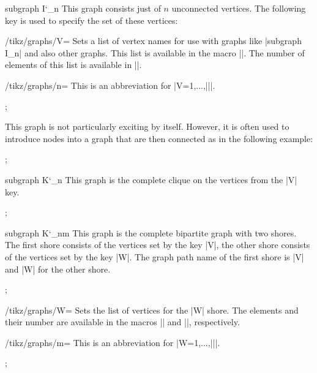 \begin{graph}{subgraph I\char`\_n}
  This graph consists just of $n$ unconnected vertices. The following
  key is used to specify the set of these vertices:
  \begin{key}{/tikz/graphs/V=}
    Sets a list of vertex names for use with graphs like
    |subgraph I_n| and also other graphs. This list is available in
    the macro |\tikzgraphV|. The number of elements of this list is
    available in |\tikzgraphVnum|.
  \end{key}
  \begin{key}{/tikz/graphs/n=}
    This is an abbreviation for |V={1,...,||}|.
  \end{key}
\begin{codeexample}[]
\tikz {};    
\end{codeexample}
  This graph is not particularly exciting by itself. However, it is
  often used to introduce nodes into a graph that are then connected
  as in the following example:
\begin{codeexample}[]
\tikz {};    
\end{codeexample}
\end{graph}


\begin{graph}{subgraph K\char`\_n}
  This graph is the complete clique on the vertices from the |V| key. 
\begin{codeexample}[]
\tikz {};    
\end{codeexample}
\end{graph}


\begin{graph}{subgraph K\char`\_nm}
  This graph is the complete bipartite graph with two shores. The
  first shore consists of the vertices set by the key |V|, the other
  shore consists of the vertices set by the key |W|. The graph path
  name of the first shore is |V| and |W| for the other shore. 
\begin{codeexample}[]
\tikz {};    
\end{codeexample}
  \begin{key}{/tikz/graphs/W=}
    Sets the list of vertices for the |W| shore. The elements and
    their number are available in the macros |\tikzgraphW| and
    |\tikzgraphWnum|, respectively.
  \end{key}
  \begin{key}{/tikz/graphs/m=}
    This is an abbreviation for |W={1,...,||}|.
  \end{key}
\begin{codeexample}[]
\tikz {};    
\end{codeexample}
\end{graph}


